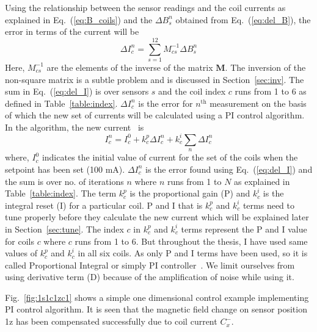 Using the relationship between the sensor readings and the coil currents as explained in Eq.~(\ref{eq:B_coils}) and the $\Delta B_s^n$ obtained from Eq.~(\ref{eq:del_B}), the error in terms of the current  will be
\begin{equation}\label{eq:del_I}
    \Delta I_c^n =\sum_{s=1}^{12} M^{-1}_{cs} \Delta B_s^n
\end{equation}
Here, $M^{-1}_{cs}$ are the elements of the inverse of the matrix $\bm{M}$. The inversion of the non-square matrix is a subtle problem and is discussed in Section~\ref{sec:inv}. The sum in Eq.~(\ref{eq:del_I}) is over sensors $s$ and the coil index $c$ runs from 1 to 6 as defined in Table~\ref{table:index}. $\Delta I_c^n$ is the error for $n^{\mathrm{th}}$ measurement on the basis of which the new set of currents will be calculated using a PI control algorithm. In the algorithm, the new current~\cite{bea} is
\begin{equation}\label{eq:I}
    I^n_c=I^0_c+k^p_c \Delta I_c^n+k^i_c\sum_n \Delta I_c^n
\end{equation}
where, $I^0_c$ indicates the initial value of current for the set of the coils when the setpoint has been set (100 mA). $\Delta I_c^n$ is the error found using Eq.~(\ref{eq:del_I}) and the sum is over no. of iterations $n$ where $n$ runs from 1 to $N$ as explained in Table~\ref{table:index}. The term $k^p_c$ is the proportional gain (P) and $k^i_c$ is the integral reset (I) for a particular coil. P and I that is $k^p_c$ and $k^i_c$ terms need to tune properly before they calculate the new current which will be explained later in Section~\ref{sec:tune}. The index $c$ in $k^p_c$ and $k^i_c$ terms represent the P and I value for coils $c$ where $c$ runs from 1 to 6. But throughout the thesis, I have used same values of $k_c^p$ and $k_c^i$ in all six coils. As only P and I terms have been used, so it is called Proportional Integral or simply PI controller~\cite{pid}. We limit ourselves from using derivative term (D) because of the amplification of noise while using it.


Fig.~\ref{fig:1s1c1zc1} shows a simple one dimensional control example implementing PI control algorithm. It is seen that the magnetic field change on sensor position 1z  has been compensated successfully due to coil current $C_x^-$. 


